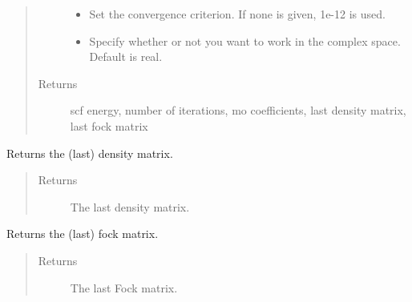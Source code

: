 \documentclass[letterpaper,10pt,english]{sphinxmanual}
\begin{document}
\begin{fulllineitems}
\begin{fulllineitems}
\begin{quote}
\begin{description}
\begin{itemize}
\item {} 
 \textendash{} Set the convergence criterion. If none is given, 1e-12 is used.

\item {} 
 \textendash{} Specify whether or not you want to work in the complex space. Default is real.

\end{itemize}

\item[{Returns}] \leavevmode
scf energy, number of iterations, mo coefficients, last density matrix, last fock matrix

\end{description}\end{quote}

\end{fulllineitems}


\begin{fulllineitems}
\label{\detokenize{RHF:hf.HartreeFock.RHF.MF.get_dens}}
Returns the (last) density matrix.
\begin{quote}\begin{description}
\item[{Returns}] \leavevmode
The last density matrix.

\end{description}\end{quote}

\end{fulllineitems}


\begin{fulllineitems}
\label{\detokenize{RHF:hf.HartreeFock.RHF.MF.get_fock}}
Returns the (last) fock matrix.
\begin{quote}\begin{description}
\item[{Returns}] \leavevmode
The last Fock matrix.

\end{description}\end{quote}


\end{fulllineitems}
\end{fulllineitems}
\end{document}
